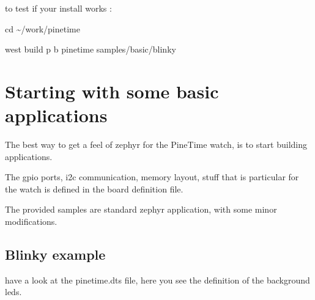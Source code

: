 \documentclass[letterpaper,10pt,english]{sphinxmanual}
\begin{document}
to test if your install works :

cd \textasciitilde{}/work/pinetime

west build \sphinxhyphen{}p \sphinxhyphen{}b pinetime samples/basic/blinky



\chapter{Starting with some basic applications}
\label{\detokenize{basicapplications:starting-with-some-basic-applications}}\label{\detokenize{basicapplications::doc}}
The best way to get a feel of zephyr for the PineTime watch, is to start building applications.

The gpio ports, i2c communication, memory layout, stuff that is particular for the watch is defined in the board definition file.

The provided samples are standard zephyr application, with some minor modifications.


\section{Blinky    example}
\label{\detokenize{basicapplications:blinky-example}}
\begin{sphinxVerbatim}[commandchars=\\\{\}]
                

           

          
\end{sphinxVerbatim}

have a look at the pinetime.dts file, here you see the definition of the background leds.

\end{document}
